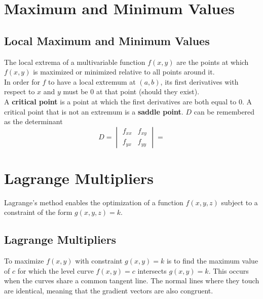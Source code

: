 \documentclass[../Calculus_\Roman{3}]{subfiles}
\begin{document}
	\section{Maximum and Minimum Values}
		\subsection*{Local Maximum and Minimum Values}
			The local extrema of a multivariable function $f(x, y)$ are the points at which $f(x, y)$ is maximized or minimized relative to all points around it. \\
			In order for $f$ to have a local extremum at $(a, b)$, its first derivatives with respect to $x$ and $y$ must be 0 at that point (should they exist). \\
			A \textbf{critical point} is a point at which the first derivatives are both equal to 0. A critical point that is not an extremum is a \textbf{saddle point}.
			$D$ can be remembered as the determinant
				\[
					D
						= \begin{vmatrix}
							f_{xx} &
								f_{xy} \\
							f_{yx} &
								f_{yy}
						\end{vmatrix}
						=
				\]
	\section{Lagrange Multipliers}
		Lagrange's method enables the optimization of a function $f(x, y, z)$ subject to a constraint of the form $g(x, y, z) = k$.
		\subsection*{Lagrange Multipliers}
			To maximize $f(x, y)$ with constraint $g(x, y) = k$ is to find the maximum value of $c$ for which the level curve $f(x, y) = c$ intersects $g(x, y) = k$. This occurs when the curves share a common tangent line. The normal lines where they touch are identical, meaning that the gradient vectors are also congruent.
\end{document}

